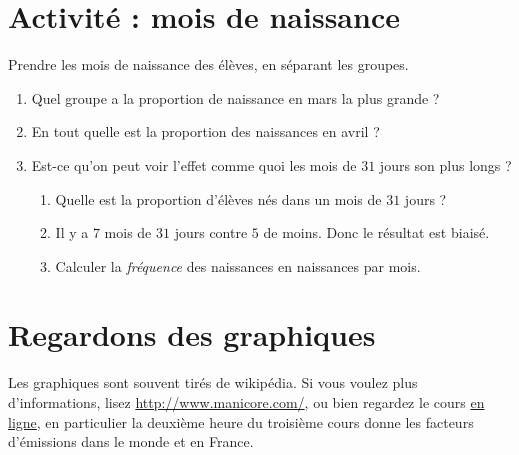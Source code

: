 

\section{Activité : mois de naissance}

Prendre les mois de naissance des élèves, en séparant les groupes.
\begin{enumerate}
    \item
        Quel groupe a la proportion de naissance en mars la plus grande ?
    \item
        En tout quelle est la proportion des naissances en avril ?
    \item 
        Est-ce qu'on peut voir l'effet comme quoi les mois de \( 31\) jours son plus longs ? 
        \begin{enumerate}
            \item
                Quelle est la proportion d'élèves nés dans un mois de \( 31\) jours ?
            \item
                Il y a \( 7\) mois de $31$ jours contre \( 5\) de moins. Donc le résultat est biaisé.
            \item
                Calculer la \emph{fréquence} des naissances en naissances par mois.
        \end{enumerate}
\end{enumerate}

\section{Regardons des graphiques}

Les graphiques sont souvent tirés de wikipédia. Si vous voulez plus d'informations, lisez \url{http://www.manicore.com/}, ou bien regardez le cours \href{http://www.mines-paristech.fr/ingenieurcivil/SitesIC/Balado/Climat_som.html}{en ligne}, en particulier la deuxième heure du troisième cours donne les facteurs d'émissions dans le monde et en France.

